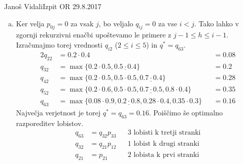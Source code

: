 \begin{naloga}{Janoš Vidali}{Izpit OR 29.8.2017}
\begin{odgovor}
\begin{enumerate}[(a)]
\item Ker velja $p_{0j} = 0$ za vsak $j$,
bo veljalo $q_{ij} = 0$ za vse $i < j$.
Tako lahko v zgornji rekurzivni enačbi
upoštevamo le primere z $j-1 \le h \le i-1$.
Izračunajmo torej vrednosti $q_{i2}$ ($2 \le i \le 5$) in $q^* = q_{63}$.
\begin{alignat*}{2}
q_{22} &= 0.2 \cdot 0.4 &&= 0.08 \\
q_{32} &= \max\{0.2 \cdot 0.5, \underline{0.5 \cdot 0.4}\} &&= 0.2 \\
q_{42} &= \max\{0.2 \cdot 0.5, 0.5 \cdot 0.5, \underline{0.7 \cdot 0.4}\} &&= 0.28 \\
q_{52} &= \max\{0.2 \cdot 0.6, 0.5 \cdot 0.5, \underline{0.7 \cdot 0.5}, 0.8 \cdot 0.4\} &&= 0.35 \\
q_{63} &= \max\{0.08 \cdot 0.9, \underline{0.2 \cdot 0.8}, 0.28 \cdot 0.4, 0.35 \cdot 0.3\} &&= 0.16
\end{alignat*}
Največja verjetnost je torej $q^* = q_{63} = 0.16$.
Poiščimo še optimalno razporeditev lobistov.
\begin{align*}
q_{63} &= q_{32} p_{33} && \text{$3$ lobisti k tretji stranki} \\
q_{32} &= q_{21} p_{12} && \text{$1$ lobist k drugi stranki} \\
q_{21} &= p_{21}        && \text{$2$ lobista k prvi stranki}
\end{align*}
\end{enumerate}
\end{odgovor}
\end{naloga}
